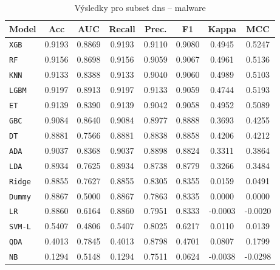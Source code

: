 \begin{table}[H]
  \centering
  \small
  \caption{Výsledky pro subset dns – malware}
  \begin{tabular}{|l|c|c|c|c|c|c|c|}
    \hline
    \textbf{Model} & \textbf{Acc} & \textbf{AUC} & \textbf{Recall} & \textbf{Prec.} & \textbf{F1} & \textbf{Kappa} & \textbf{MCC} \\
    \hline
    \texttt{XGB} & 0.9193 & 0.8869 & 0.9193 & 0.9110 & 0.9080 & 0.4945 & 0.5247 \\
    \texttt{RF} & 0.9156 & 0.8698 & 0.9156 & 0.9059 & 0.9067 & 0.4961 & 0.5136 \\
    \texttt{KNN} & 0.9133 & 0.8388 & 0.9133 & 0.9040 & 0.9060 & 0.4989 & 0.5103 \\
    \texttt{LGBM} & 0.9197 & 0.8913 & 0.9197 & 0.9133 & 0.9059 & 0.4744 & 0.5193 \\
    \texttt{ET} & 0.9139 & 0.8390 & 0.9139 & 0.9042 & 0.9058 & 0.4952 & 0.5089 \\
    \texttt{GBC} & 0.9084 & 0.8640 & 0.9084 & 0.8977 & 0.8888 & 0.3693 & 0.4255 \\
    \texttt{DT} & 0.8881 & 0.7566 & 0.8881 & 0.8838 & 0.8858 & 0.4206 & 0.4212 \\
    \texttt{ADA} & 0.9037 & 0.8368 & 0.9037 & 0.8898 & 0.8824 & 0.3311 & 0.3864 \\
    \texttt{LDA} & 0.8934 & 0.7625 & 0.8934 & 0.8738 & 0.8779 & 0.3266 & 0.3484 \\
    \texttt{Ridge} & 0.8855 & 0.7627 & 0.8855 & 0.8305 & 0.8355 & 0.0159 & 0.0491 \\
    \texttt{Dummy} & 0.8867 & 0.5000 & 0.8867 & 0.7863 & 0.8335 & 0.0000 & 0.0000 \\
    \texttt{LR} & 0.8860 & 0.6164 & 0.8860 & 0.7951 & 0.8333 & -0.0003 & -0.0020 \\
    \texttt{SVM-L} & 0.5407 & 0.4806 & 0.5407 & 0.8025 & 0.6217 & 0.0110 & 0.0139 \\
    \texttt{QDA} & 0.4013 & 0.7845 & 0.4013 & 0.8798 & 0.4701 & 0.0807 & 0.1799 \\
    \texttt{NB} & 0.1294 & 0.5148 & 0.1294 & 0.7511 & 0.0624 & -0.0038 & -0.0298 \\
    \hline
  \end{tabular}
\end{table}
\vspace{0.5cm}

